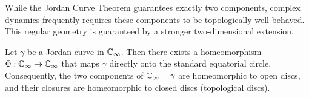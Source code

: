 While the Jordan Curve Theorem guarantees exactly two components, complex
dynamics frequently requires these components to be topologically well-behaved.
This regular geometry is guaranteed by a stronger two-dimensional extension.

\begin{theorem*}
    \label{thm:schoenflies_theorem}
    Let $\gamma$ be a Jordan curve in $\mathbb{C}_\infty$. Then there exists a homeomorphism
    $\Phi: \mathbb{C}_\infty \to \mathbb{C}_\infty$ that maps $\gamma$ directly onto the standard
    equatorial circle. Consequently, the two components of $\mathbb{C}_\infty - \gamma$
    are homeomorphic to open discs, and their closures are homeomorphic to closed
    discs (topological discs).
\end{theorem*}

\tableofcontents